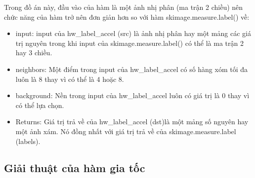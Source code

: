     Trong đồ án này, đầu vào của hàm là một ảnh nhị phân (ma trận 2 chiều) nên chức năng của hàm trở nên đơn giản hơn so với hàm skimage.measure.label() về:
    \begin{itemize}
        \item input: input của hw\_label\_accel (src) là ảnh nhị phân hay một mảng các giá trị nguyên trong khi input của skimage.measure.label() có thể là ma trận 2 hay 3 chiều.
        \item neighbors: Một điểm trong input của hw\_label\_accel có số hàng xóm tối đa luôn là 8 thay vì có thể là 4 hoặc 8.
        \item background: Nền trong input của hw\_label\_accel luôn có giá trị là 0 thay vì có thể lựa chọn.
        \item Returns: Giá trị trả về của hw\_label\_accel (dst)là một mảng số nguyên hay một ảnh xám. Nó đồng nhất với giá trị trả về của skimage.measure.label (labels).
    \end{itemize}
    
    \subsection{Giải thuật của hàm gia tốc}
    
